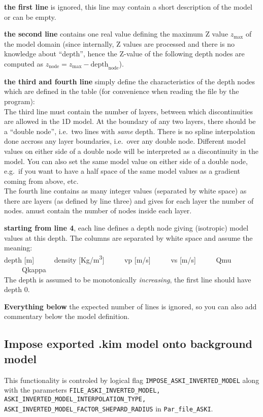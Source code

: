 \documentclass[12pt,a4paper]{article}
\newcommand{\lcode}[1]{\nolinkurl{#1}}
\newcommand{\lcodetitle}[1]{ {\ttfamily #1} }
\begin{document}
{\bf the first line} is ignored, this line may contain a short description of the model or can be empty.

{\bf the second line} contains one real value defining the maximum Z value $z_\text{max}$ of the model domain
(since internally, Z values are processed and there is no knowledge about ``depth'', hence the Z-value 
of the following depth nodes are computed as $z_\text{node} = z_\text{max} - \text{depth}_\text{node}$).

{\bf the third and fourth line} simply define the characteristics of the depth nodes which are defined 
in the table (for convenience when reading the file by the program):\\
The third line must contain the number of layers, between which discontinuities are allowed in the 1D model. 
At the boundary of any two layers, there should be a ``double node'', i.e.\ two lines with \emph{same} depth. 
There is no spline interpolation done accross any layer boundaries, i.e.\ over any double node. 
Different model values on either side of a double node will be interpreted as a discontinuity in the model. 
You can also set the same model value on either side of a double node, e.g.\ if you want to have a half space
of the same model values as a gradient coming from above, etc.\\
The fourth line contains as many integer values (separated by white space) as there are layers 
(as defined by line three) and gives for each layer the number of nodes. 
amust contain the number of nodes inside each layer. 

{\bf starting from line 4}, each line defines a depth node giving (isotropic) model values at this depth.
The columns are separated by white space and assume the meaning:\\
depth [m] \ \ \ \ \ density [Kg/m\textsuperscript{3}] \ \ \ \ \ vp [m/s] \ \ \ \ \ vs [m/s] \ \ \ \ \ Qmu \ \ \ \ \ Qkappa\\
The depth is assumed to be monotonically \emph{increasing}, the first line should have depth 0. 

{\bf Everything below} the expected number of lines is ignored, so you can also add commentary below the
model definition.




\subsection{Impose exported \lcodetitle{.kim} model onto background model} \label{import_model:ssec_kim_export}
This functionality is controled by logical flag \lcode{IMPOSE_ASKI_INVERTED_MODEL} along with
the parameters \lcode{FILE_ASKI_INVERTED_MODEL, ASKI_INVERTED_MODEL_INTERPOLATION_TYPE, 
ASKI_INVERTED_MODEL_FACTOR_SHEPARD_RADIUS} in \lcode{Par_file_ASKI}.
\end{document}
